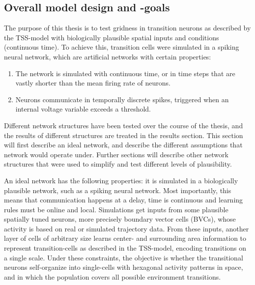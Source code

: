 \documentclass{article}
\begin{document}
    \subsection{Overall model design and -goals}The purpose of this thesis is to test gridness in transition neurons as described by the TSS-model with biologically plausible spatial inputs and conditions (continuous time). To achieve this, transition cells were simulated in a spiking neural network, which are artificial networks with certain properties:
    \begin{enumerate}
        \item The network is simulated with continuous time, or in time steps that are vastly shorter than the mean firing rate of neurons.
        \item Neurons communicate in temporally discrete spikes, triggered when an internal voltage variable exceeds a threshold.
    \end{enumerate}
    
    Different network structures have been tested over the course of the thesis, and the results of different structures are treated in the results section. This section will first describe an ideal network, and describe the different assumptions that network would operate under. Further sections will describe other network structures that were used to simplify and test different levels of plausibility.

    An ideal network has the following properties: it is simulated in a biologically plausible network, such as a spiking neural network. Most importantly, this means that communication happens at a delay, time is continuous and learning rules must be online and local. Simulations get inputs from some plausible spatially tuned neurons, more precisely boundary vector cells (BVCs), whose activity is based on real or simulated trajectory data. From these inputs, another layer of cells of arbitrary size learns center- and surrounding area information to represent transition-cells as described in the TSS-model, encoding transitions on a single scale. Under these constraints, the objective is whether the transitional neurons self-organize into single-cells with hexagonal activity patterns in space, and in which the population covers all possible environment transitions.
\end{document}
